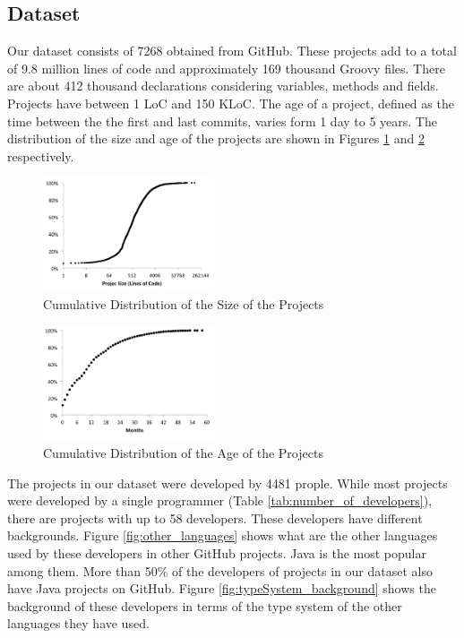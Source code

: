 \documentclass[preprint]{sigplanconf}
\begin{document}
\subsection{Dataset\label{dataset}}


Our dataset consists of 7268 obtained from GitHub. 
These projects add to a total of 9.8 million lines of code and approximately 169 thousand Groovy files. 
There are about 412 thousand declarations considering variables, methods and fields. Projects have between 1 LoC and 150 KLoC. The age of a project, defined as the time between the the first and last commits, varies form 1 day to 5 years. The distribution of the size and age of the projects are shown in Figures \ref{fig:size_distribution} and \ref{fig:age_distribution} respectively. 

\begin{figure}[ht]
\centering \includegraphics[width=0.45\textwidth]{images/size_distribution}
\caption{Cumulative Distribution of the Size of the Projects}
\label{fig:size_distribution} 
\end{figure}

\begin{figure}[ht]
\centering \includegraphics[width=0.45\textwidth]{images/age_distribution}
\caption{Cumulative Distribution of the Age of the Projects}
\label{fig:age_distribution} 
\end{figure}

The projects in our dataset were developed by 4481 prople. 
While most projects were developed by a single programmer (Table \ref{tab:number_of_developers}), there are projects with up to 58 developers.
These developers have different backgrounds.
Figure \ref{fig:other_languages} shows what are the other languages used by these developers in other GitHub projects. 
Java is the most popular among them.
More than 50\% of the developers of projects in our dataset also have Java projects on GitHub.
Figure \ref{fig:typeSystem_background} shows the background of these developers in terms of the type system of the other languages they have used.
 
\end{document}
